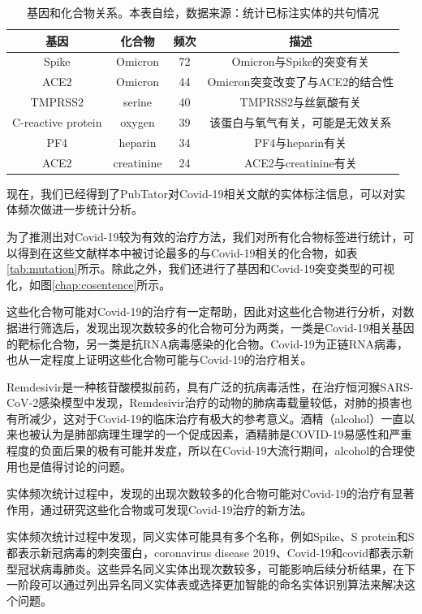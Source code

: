 \documentclass[twocolumn]{article}
\begin{document}
\begin{table}[ht!]
	\centering
	\caption{基因和化合物关系。本表自绘，数据来源：统计已标注实体的共句情况}
	\begin{tabular}{cccc}
		\hline
		基因 & 化合物 & 频次 & 描述\\
		\hline
		Spike & Omicron & 72 & Omicron与Spike的突变有关\\
		ACE2 & Omicron & 44 & Omicron突变改变了与ACE2的结合性\\
		TMPRSS2 & serine & 40 & TMPRSS2与丝氨酸有关\\
		C-reactive protein & oxygen & 39 & 该蛋白与氧气有关，可能是无效关系\\
		PF4 & heparin & 34 & PF4与heparin有关\\
		ACE2 & creatinine & 24 & ACE2与creatinine有关\\
		\hline
	\end{tabular}
	\label{tab:gene_mutation}
\end{table}

现在，我们已经得到了PubTator对Covid-19相关文献的实体标注信息，可以对实体频次做进一步统计分析。\par
为了推测出对Covid-19较为有效的治疗方法，我们对所有化合物标签进行统计，可以得到在这些文献样本中被讨论最多的与Covid-19相关的化合物，如表\ref{tab:mutation}所示。除此之外，我们还进行了基因和Covid-19突变类型的可视化，如图\ref{chap:cosentence}所示。\par
这些化合物可能对Covid-19的治疗有一定帮助，因此对这些化合物进行分析，对数据进行筛选后，发现出现次数较多的化合物可分为两类，一类是Covid-19相关基因的靶标化合物，另一类是抗RNA病毒感染的化合物。Covid-19为正链RNA病毒，也从一定程度上证明这些化合物可能与Covid-19的治疗相关。\par
Remdesivir是一种核苷酸模拟前药，具有广泛的抗病毒活性，在治疗恒河猴SARS-CoV-2感染模型中发现，Remdesivir治疗的动物的肺病毒载量较低，对肺的损害也有所减少\cite{PPR:PPR151409}，这对于Covid-19的临床治疗有极大的参考意义。酒精（alcohol）一直以来也被认为是肺部病理生理学的一个促成因素，酒精肺是COVID-19易感性和严重程度的负面后果的极有可能并发症\cite{BAILEY202111}，所以在Covid-19大流行期间，alcohol的合理使用也是值得讨论的问题。\par
实体频次统计过程中，发现的出现次数较多的化合物可能对Covid-19的治疗有显著作用，通过研究这些化合物或可发现Covid-19治疗的新方法。\par
实体频次统计过程中发现，同义实体可能具有多个名称，例如Spike、S protein和S都表示新冠病毒的刺突蛋白，coronavirus disease 2019、Covid-19和covid都表示新型冠状病毒肺炎。这些异名同义实体出现次数较多，可能影响后续分析结果，在下一阶段可以通过列出异名同义实体表或选择更加智能的命名实体识别算法来解决这个问题。\par
\end{document}
